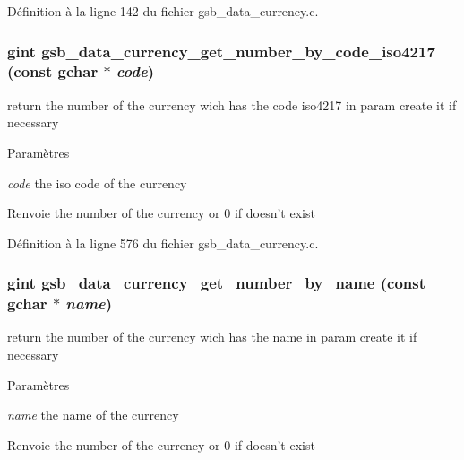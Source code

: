 Définition à la ligne 142 du fichier gsb\_\-data\_\-currency.c.

\subsubsection[{gsb\_\-data\_\-currency\_\-get\_\-number\_\-by\_\-code\_\-iso4217}]{\setlength{\rightskip}{0pt plus 5cm}gint gsb\_\-data\_\-currency\_\-get\_\-number\_\-by\_\-code\_\-iso4217 (const gchar $\ast$ {\em code})}\label{gsb__data__currency_8h_ad6f48bd7a2a3533c4be0f5453d2be28b}
return the number of the currency wich has the code iso4217 in param create it if necessary


\begin{DoxyParams}{Paramètres}
\item[{\em code}]the iso code of the currency\end{DoxyParams}
\begin{DoxyReturn}{Renvoie}
the number of the currency or 0 if doesn't exist 
\end{DoxyReturn}


Définition à la ligne 576 du fichier gsb\_\-data\_\-currency.c.

\subsubsection[{gsb\_\-data\_\-currency\_\-get\_\-number\_\-by\_\-name}]{\setlength{\rightskip}{0pt plus 5cm}gint gsb\_\-data\_\-currency\_\-get\_\-number\_\-by\_\-name (const gchar $\ast$ {\em name})}\label{gsb__data__currency_8h_a07a3bca074a1181fd741e4bb4ef1581b}
return the number of the currency wich has the name in param create it if necessary


\begin{DoxyParams}{Paramètres}
\item[{\em name}]the name of the currency\end{DoxyParams}
\begin{DoxyReturn}{Renvoie}
the number of the currency or 0 if doesn't exist 
\end{DoxyReturn}


